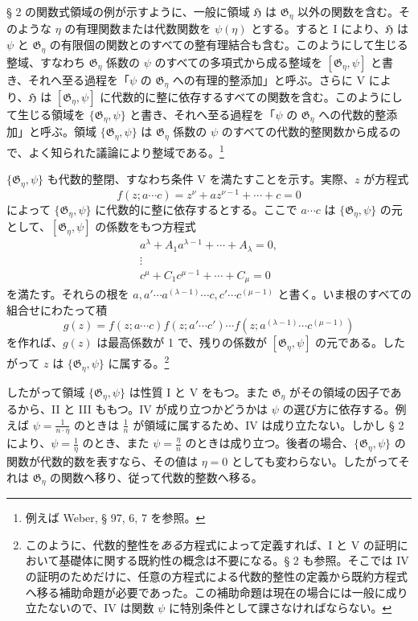 \documentclass[11pt]{article}
\begin{document}
§ 2 の関数式領域の例が示すように、一般に領域 $\mathfrak H$ は $\mathfrak G_\eta$ 以外の関数を含む。そのような $\eta$ の有理関数または代数関数を $\psi(\eta)$ とする。すると I により、$\mathfrak H$ は $\psi$ と $\mathfrak G_\eta$ の有限個の関数とのすべての整有理結合も含む。このようにして生じる整域、すなわち $\mathfrak G_\eta$ 係数の $\psi$ のすべての多項式から成る整域を $[\mathfrak G_\eta,\psi]$ と書き、それへ至る過程を「$\psi$ の $\mathfrak G_\eta$ への有理的整添加」と呼ぶ。さらに V により、$\mathfrak H$ は $[\mathfrak G_\eta,\psi]$ に代数的に整に依存するすべての関数を含む。このようにして生じる領域を $\{\mathfrak G_\eta,\psi\}$ と書き、それへ至る過程を「$\psi$ の $\mathfrak G_\eta$ への代数的整添加」と呼ぶ。領域 $\{\mathfrak G_\eta,\psi\}$ は $\mathfrak G_\eta$ 係数の $\psi$ のすべての代数的整関数から成るので、よく知られた議論により整域である。\footnote{例えば Weber, § 97, 6, 7 を参照。}

$\{\mathfrak G_\eta,\psi\}$ も代数的整閉、すなわち条件 V を満たすことを示す。実際、$z$ が方程式
\[
 f(z;a\cdots c)=z^\nu+a z^{\nu-1}+\cdots+c=0
\]
によって $\{\mathfrak G_\eta,\psi\}$ に代数的に整に依存するとする。ここで $a\cdots c$ は $\{\mathfrak G_\eta,\psi\}$ の元として、$[\mathfrak G_\eta,\psi]$ の係数をもつ方程式
\[
\begin{gathered}
 a^\lambda+A_1a^{\lambda-1}+\cdots+A_\lambda=0,\\
 \vdots\\
 c^\mu+C_1c^{\mu-1}+\cdots+C_\mu=0
\end{gathered}
\]
を満たす。それらの根を
$a,a'\cdots a^{(\lambda-1)}\cdots c,c'\cdots c^{(\mu-1)}$ と書く。いま根のすべての組合せにわたって積
\[
 g(z)=f(z;a\cdots c)f(z;a'\cdots c')\cdots
      f(z;a^{(\lambda-1)}\cdots c^{(\mu-1)})
\]
を作れば、$g(z)$ は最高係数が 1 で、残りの係数が $[\mathfrak G_\eta,\psi]$ の元である。したがって $z$ は $\{\mathfrak G_\eta,\psi\}$ に属する。\footnote{このように、代数的整性を\emph{ある}方程式によって定義すれば、I と V の証明において基礎体に関する既約性の概念は不要になる。§ 2 も参照。そこでは IV の証明のためだけに、任意の方程式による代数的整性の定義から既約方程式へ移る補助命題が必要であった。この補助命題は現在の場合には一般に成り立たないので、IV は関数 $\psi$ に特別条件として課さなければならない。}

したがって領域 $\{\mathfrak G_\eta,\psi\}$ は性質 I と V をもつ。また $\mathfrak G_\eta$ がその領域の因子であるから、II と III ももつ。IV が成り立つかどうかは $\psi$ の選び方に依存する。例えば $\psi=\frac{1}{n\cdot\eta}$ のときは $\frac1n$ が領域に属するため、IV は成り立たない。しかし § 2 により、$\psi=\frac1\eta$ のとき、また $\psi=\frac{\eta}{n}$ のときは成り立つ。後者の場合、$\{\mathfrak G_\eta,\psi\}$ の関数が代数的数を表すなら、その値は $\eta=0$ としても変わらない。したがってそれは $\mathfrak G_\eta$ の関数へ移り、従って代数的整数へ移る。
\end{document}
